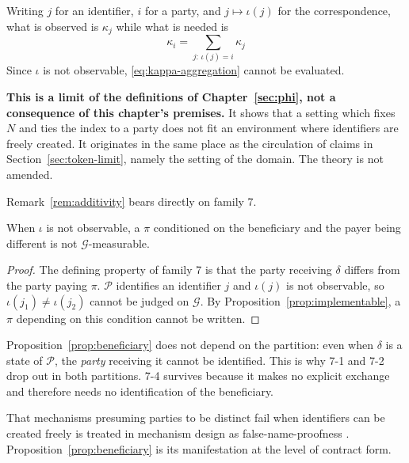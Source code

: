 \begin{remark}
\label{rem:additivity}
Writing $j$ for an identifier, $i$ for a party, and $j\mapsto\iota(j)$ for the
correspondence, what is observed is $\kappa_j$ while what is needed is
\begin{equation}
\kappa_i = \sum_{j:\,\iota(j)=i} \kappa_j
\label{eq:kappa-aggregation}
\end{equation}
Since $\iota$ is not observable, \eqref{eq:kappa-aggregation} cannot be evaluated.

\textbf{This is a limit of the definitions of Chapter~\ref{sec:phi}, not a consequence of
this chapter's premises.} It shows that a setting which fixes $N$ and ties the index to a
party does not fit an environment where identifiers are freely created. It originates in the
same place as the circulation of claims in Section~\ref{sec:token-limit}, namely the setting
of the domain. The theory is not amended.
\end{remark}

Remark~\ref{rem:additivity} bears directly on family 7.

\begin{proposition}
\label{prop:beneficiary}
When $\iota$ is not observable, a $\pi$ conditioned on the beneficiary and the payer being
different is not $\mathcal{G}$-measurable.
\end{proposition}

\begin{proof}
The defining property of family 7 is that the party receiving $\delta$ differs from the party
paying $\pi$.
$\mathcal{P}$ identifies an identifier $j$ and $\iota(j)$ is not observable, so
$\iota(j_1)\neq\iota(j_2)$ cannot be judged on $\mathcal{G}$. By
Proposition~\ref{prop:implementable}, a $\pi$ depending on this condition cannot be written.
\end{proof}

Proposition~\ref{prop:beneficiary} does not depend on the partition: even when $\delta$ is a
state of $\mathcal{P}$, the \emph{party} receiving it cannot be identified. This is why 7-1
and 7-2 drop out in both partitions. 7-4 survives because it makes no explicit exchange and
therefore needs no identification of the beneficiary.

That mechanisms presuming parties to be distinct fail when identifiers can be created freely
is treated in mechanism design as false-name-proofness \cite{yokoo2004}.
Proposition~\ref{prop:beneficiary} is its manifestation at the level of contract form.

